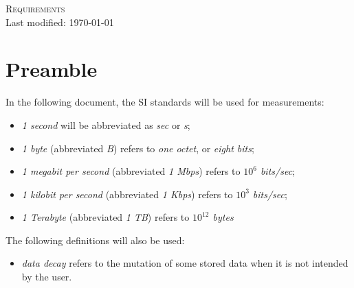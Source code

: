 \documentclass[10pt,a4paper]{report}
\begin{document}
    \begin{center}
        {\LARGE \textsc{Requirements}}\\
        Last modified: \today
    \end{center}
    \section*{Preamble}
        In the following document, the SI standards will be used for measurements:
        \begin{itemize}
            \item \emph{1 second} will be abbreviated as \emph{sec} or \emph{s};
            
            \item \emph{1 byte} (abbreviated \emph{B}) refers to \emph{one octet}, or \emph{eight bits};
            
            \item \emph{1 megabit per second} (abbreviated \emph{1 Mbps}) refers to \emph{$10^6$ bits/sec};
            
            \item \emph{1 kilobit per second} (abbreviated \emph{1 Kbps}) refers to \emph{$10^3$ bits/sec};
            
            \item \emph{1 Terabyte} (abbreviated \emph{1 TB}) refers to \emph{$10^{12}$ bytes}
        \end{itemize}
        The following definitions will also be used:
        \begin{itemize}
            \item \emph{data decay} refers to the mutation of some stored data when it is not intended by the user.
        
        \end{itemize}
\end{document}
